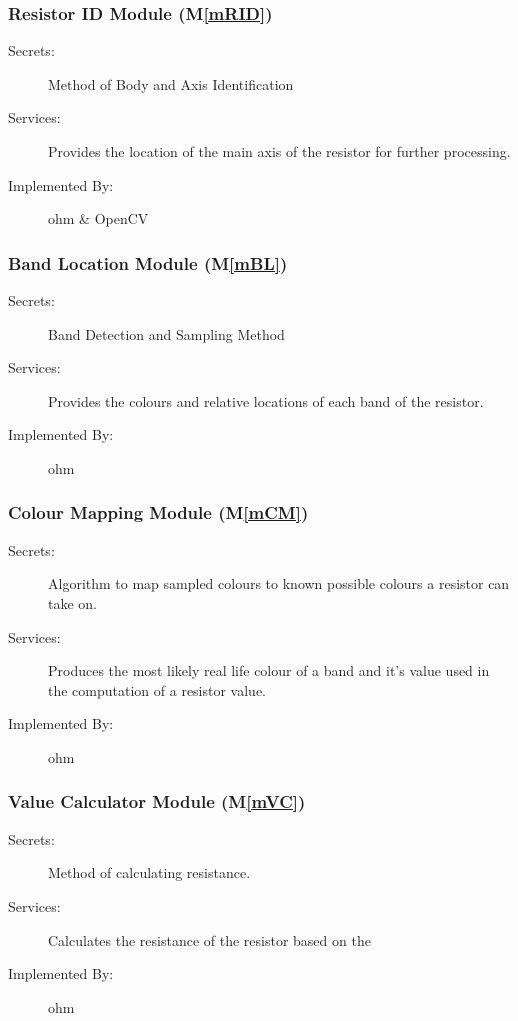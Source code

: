 \documentclass[12pt, titlepage]{article}
\newcommand{\mref}[1]{M\ref{#1}}
\begin{document}
\subsubsection{Resistor ID Module (\mref{mRID})}

\begin{description}
\item[Secrets:] Method of Body and Axis Identification
\item[Services:] Provides the location of the main axis of the resistor for further processing.
\item[Implemented By:] ohm \& OpenCV
\end{description}

\subsubsection{Band Location Module (\mref{mBL})}

\begin{description}
\item[Secrets:] Band Detection and Sampling Method
\item[Services:] Provides the colours and relative locations of each band of the resistor.
\item[Implemented By:] ohm
\end{description}

\subsubsection{Colour Mapping Module (\mref{mCM})}

\begin{description}
\item[Secrets:] Algorithm to map sampled colours to known possible colours a resistor can take on.
\item[Services:] Produces the most likely real life colour of a band and it's value used in the computation of a resistor value.
\item[Implemented By:] ohm
\end{description}

\subsubsection{Value Calculator Module (\mref{mVC})}

\begin{description}
\item[Secrets:] Method of calculating resistance.
\item[Services:] Calculates the resistance of the resistor based on the 
\item[Implemented By:] ohm
\end{description}
\end{document}
